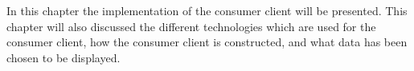 In this chapter the implementation of the consumer client will be presented.
This chapter will also discussed the different technologies which are used for the consumer client, how the consumer client is constructed, and what data has been chosen to be displayed.
